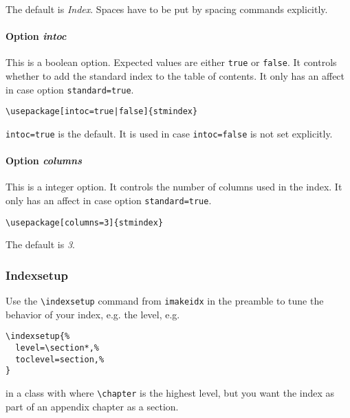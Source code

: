 \documentclass[%
  type=article,%
  layout=koma,%
  conditionallox=true,%
  conditionalloxnewpage=false,%
  date=true,%
  hyperref=true,%
  index=false,%
  listings=true%
]{stmtext}
\begin{document}
The default is \textit{Index}. Spaces have to be put by spacing commands explicitly.

\paragraph{Option \protect\textit{intoc}} 
\label{sec:usage:preamble:options:intoc}

This is a boolean option. Expected values are either \texttt{true} or \texttt{false}. It controls whether to add the standard index to the table of contents. It only has an affect in case option \texttt{standard=true}.

\begin{verbatim}
\usepackage[intoc=true|false]{stmindex}
\end{verbatim}

\texttt{intoc=true} is the default. It is used in case \texttt{intoc=false} is not set explicitly.

\paragraph{Option \protect\textit{columns}} 
\label{sec:usage:preamble:options:columns}

This is a integer option. It controls the number of columns used in the index.  It only has an affect in case option \texttt{standard=true}.

\begin{verbatim}
\usepackage[columns=3]{stmindex}
\end{verbatim}

The default is \textit{3}.

\subsubsection{Indexsetup}

Use the \verb+\indexsetup+ command from \texttt{imakeidx} in the preamble to tune the behavior of your index, e.g. the level, e.g.

\begin{verbatim}
\indexsetup{%
  level=\section*,%
  toclevel=section,%
}
\end{verbatim}

in a class with where \verb+\chapter+ is the highest level, but you want the index as part of an appendix chapter as a section.
\end{document}
